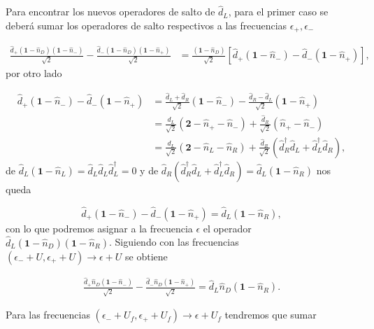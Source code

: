 \begin{appendixs}
Para encontrar los nuevos operadores de salto de $\hat{d}_{L}$, para el primer caso se deberá sumar los operadores de salto respectivos a las frecuencias $\epsilon_{+},\epsilon_{-}$ 

\begin{align*}
    \frac{\hat{d}_{+}(\textbf{1}-\hat{n}_{D})(\textbf{1}-\hat{n}_{-})}{\sqrt{2}} - \frac{\hat{d}_{-}(\textbf{1}-\hat{n}_{D})(\textbf{1}-\hat{n}_{+})}{\sqrt{2}} & = \frac{(\textbf{1}-\hat{n}_{D})}{\sqrt{2}} [\hat{d}_{+}(\textbf{1}-\hat{n}_{-}) - \hat{d}_{-}(\textbf{1}-\hat{n}_{+}) ],
\end{align*}
por otro lado

\begin{align*}
    \hat{d}_{+}(\textbf{1}-\hat{n}_{-}) - \hat{d}_{-}(\textbf{1}-\hat{n}_{+}) & = \frac{\hat{d}_{L} + \hat{d}_{R}}{\sqrt{2}} (\textbf{1} - \hat{n}_{-}) - \frac{\hat{d}_{R} - \hat{d}_{L}}{\sqrt{2}}(\textbf{1}-\hat{n}_{+}) \\
    & = \frac{\hat{d}_{L}}{\sqrt{2}}(\textbf{2} - \hat{n}_{+} -\hat{n}_{-} ) + \frac{\hat{d}_{R}}{\sqrt{2}}(\hat{n}_{+} -\hat{n}_{-}) \\
    & = \frac{\hat{d}_{L}}{\sqrt{2}}(\textbf{2}-\hat{n}_{L} -\hat{n}_{R}) + \frac{\hat{d}_{R}}{\sqrt{2}}(\hat{d}^{\dagger}_{R}\hat{d}_{L}+\hat{d}^{\dagger}_{L}\hat{d}_{R}),
\end{align*}
de $\hat{d}_{L}(\textbf{1} - \hat{n}_{L}) = \hat{d}_{L}\hat{d}_{L}\hat{d}^{\dagger}_{L} = 0$ y de $\hat{d}_{R}(\hat{d}^{\dagger}_{R}\hat{d}_{L} + \hat{d}^{\dagger}_{L}\hat{d}_{R}) = \hat{d}_{L}(\textbf{1}-\hat{n}_{R})$ nos queda

\begin{equation*}
    \hat{d}_{+}(\textbf{1}-\hat{n}_{-}) - \hat{d}_{-}(\textbf{1}-\hat{n}_{+})  = \hat{d}_{L}(\textbf{1} - \hat{n}_{R}),
\end{equation*}
con lo que podremos asignar a la frecuencia $\epsilon$ el operador $\hat{d}_{L}(\textbf{1}-\hat{n}_{D})(\textbf{1}-\hat{n}_{R})$. Siguiendo con las frecuencias $(\epsilon_{-}+U,\epsilon_{+}+U) \to \epsilon + U$ se obtiene

\begin{align*}
    \frac{\hat{d}_{+}\hat{n}_{D}(\textbf{1}-\hat{n}_{-})}{\sqrt{2}} - \frac{\hat{d}_{-}\hat{n}_{D}(\textbf{1}-\hat{n}_{+})}{\sqrt{2}} = \hat{d}_{L}\hat{n}_{D}(\textbf{1}-\hat{n}_{R}). 
\end{align*}

Para las frecuencias $(\epsilon_{-}+U_{f},\epsilon_{+}+U_{f}) \to \epsilon+U_{f}$ tendremos que sumar


\end{appendixs}
